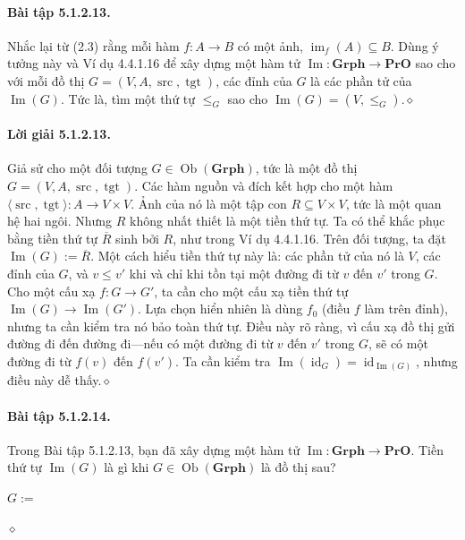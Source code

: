 \paragraph{Bài tập 5.1.2.13.} Nhắc lại từ (2.3) rằng mỗi hàm $f:A\to B$ có một ảnh, $\operatorname{im}_f(A)\subseteq B$. Dùng ý tưởng này và Ví dụ 4.4.1.16 để xây dựng một hàm tử $\operatorname{Im}:\mathbf{Grph}\to\mathbf{PrO}$ sao cho với mỗi đồ thị $G=(V,A,\operatorname{src},\operatorname{tgt})$, các đỉnh của $G$ là các phần tử của $\operatorname{Im}(G)$. Tức là, tìm một thứ tự $\leq_G$ sao cho $\operatorname{Im}(G)=(V,\leq_G)$.\hfill$\diamond$
\paragraph{Lời giải 5.1.2.13.} Giả sử cho một đối tượng $G\in\operatorname{Ob}(\mathbf{Grph})$, tức là một đồ thị $G=(V,A,\operatorname{src},\operatorname{tgt})$. Các hàm nguồn và đích kết hợp cho một hàm $\langle\operatorname{src},\operatorname{tgt}\rangle:A\to V\times V$. Ảnh của nó là một tập con $R\subseteq V\times V$, tức là một quan hệ hai ngôi. Nhưng $R$ không nhất thiết là một tiền thứ tự. Ta có thể khắc phục bằng tiền thứ tự $\overline R$ sinh bởi $R$, như trong Ví dụ 4.4.1.16. Trên đối tượng, ta đặt $\operatorname{Im}(G):=\overline R$. Một cách hiểu tiền thứ tự này là: các phần tử của nó là $V$, các đỉnh của $G$, và $v\leq v'$ khi và chỉ khi tồn tại một đường đi từ $v$ đến $v'$ trong $G$.
Cho một cấu xạ $f:G\to G'$, ta cần cho một cấu xạ tiền thứ tự $\operatorname{Im}(G)\to\operatorname{Im}(G')$. Lựa chọn hiển nhiên là dùng $f_0$ (điều $f$ làm trên đỉnh), nhưng ta cần kiểm tra nó bảo toàn thứ tự. Điều này rõ ràng, vì cấu xạ đồ thị gửi đường đi đến đường đi---nếu có một đường đi từ $v$ đến $v'$ trong $G$, sẽ có một đường đi từ $f(v)$ đến $f(v')$. Ta cần kiểm tra $\operatorname{Im}(\operatorname{id}_G)=\operatorname{id}_{\operatorname{Im}(G)}$, nhưng điều này dễ thấy.\hfill$\diamond$
\paragraph{Bài tập 5.1.2.14.} Trong Bài tập 5.1.2.13, bạn đã xây dựng một hàm tử $\operatorname{Im}:\mathbf{Grph}\to\mathbf{PrO}$. Tiền thứ tự $\operatorname{Im}(G)$ là gì khi $G\in\operatorname{Ob}(\mathbf{Grph})$ là đồ thị sau?
\begin{center}$G:=$\quad{}\end{center}\hfill$\diamond$
